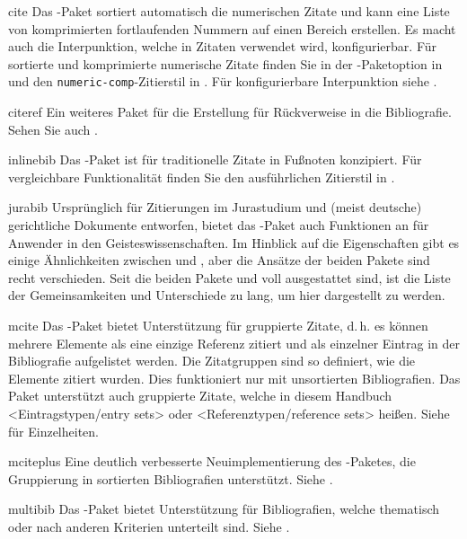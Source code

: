 \documentclass{ltxdockit}[2011/03/25]
\begin{document}
\begin{marglist}
\item[cite] 
Das -Paket sortiert automatisch die numerischen Zitate und
kann eine Liste von komprimierten fortlaufenden Nummern auf einen Bereich
erstellen. Es macht auch die Interpunktion, welche in Zitaten verwendet wird,
konfigurierbar. Für sortierte und komprimierte numerische Zitate finden Sie in
der -Paketoption in  und den
\texttt{numeric-comp}-Zitierstil in . Für
konfigurierbare Interpunktion siehe . 

\item[citeref] 
Ein weiteres Paket für die Erstellung für Rückverweise in die
Bibliografie. Sehen Sie auch . 

\item[inlinebib] 
Das -Paket ist für traditionelle Zitate in
Fußnoten konzipiert. Für vergleichbare Funktionalität finden Sie den
ausführlichen Zitierstil in . 

\item[jurabib] 
Ursprünglich für Zitierungen im Jurastudium und (meist deutsche)
gerichtliche Dokumente entworfen, bietet das -Paket auch Funktionen
an für Anwender in den Geisteswissenschaften. Im Hinblick auf die Eigenschaften
gibt es einige Ähnlichkeiten zwischen  und , aber die
Ansätze der beiden Pakete sind recht verschieden. Seit die beiden Pakete
 und  voll ausgestattet sind, ist die Liste der
Gemeinsamkeiten und Unterschiede zu lang, um hier dargestellt zu werden. 

\item[mcite]
Das -Paket bietet Unterstützung für gruppierte Zitate, d.\,h. es
können mehrere Elemente als eine einzige Referenz zitiert und als einzelner
Eintrag in der Bibliografie aufgelistet werden. Die Zitatgruppen sind so
definiert, wie die Elemente zitiert wurden. Dies funktioniert nur mit
unsortierten Bibliografien. Das Paket  unterstützt auch
gruppierte Zitate, welche in diesem Handbuch <Eintragstypen/entry sets> oder
<Referenztypen/reference sets> heißen. Siehe
 für Einzelheiten. 

\item[mciteplus] 
Eine deutlich verbesserte Neuimplementierung des
-Paketes, die Gruppierung in sortierten Bibliografien unterstützt.
Siehe . 

\item[multibib] 
Das -Paket bietet Unterstützung für
Bibliografien, welche thematisch oder nach anderen Kriterien unterteilt sind.
Siehe .


\end{marglist}
\end{document}
